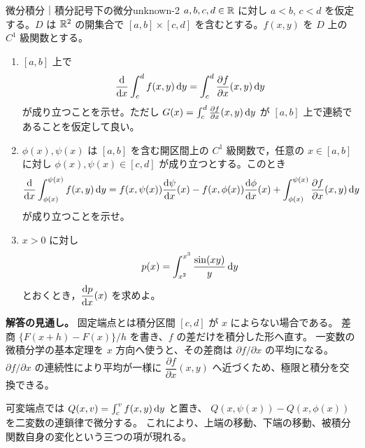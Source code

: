 \begin{problem}{微分積分｜積分記号下の微分}{unknown-2}
$a,b,c,d\in\mathbb{R}$ に対し $a<b$, $c<d$ を仮定する。$D$ は $\mathbb{R}^2$ の開集合で $[a,b]\times[c,d]$ を含むとする。$f(x,y)$ を $D$ 上の $C^1$ 級関数とする。
\begin{enumerate}
  \item[(1)] $[a,b]$ 上で
  \[
  \frac{\mathrm{d}}{\mathrm{d} x}\int_c^d f(x,y)\,\mathrm{d} y=\int_c^d\frac{\partial f}{\partial x}(x,y)\,\mathrm{d} y
  \]
  が成り立つことを示せ。ただし $G(x)=\int_c^d\frac{\partial f}{\partial x}(x,y)\,\mathrm{d} y$ が $[a,b]$ 上で連続であることを仮定して良い。
  \item[(2)] $\phi(x),\psi(x)$ は $[a,b]$ を含む開区間上の $C^1$ 級関数で，任意の $x\in[a,b]$ に対し $\phi(x),\psi(x)\in[c,d]$ が成り立つとする。このとき
  \[
  \frac{\mathrm{d}}{\mathrm{d} x}\int_{\phi(x)}^{\psi(x)}f(x,y)\,\mathrm{d} y
  =f(x,\psi(x))\frac{\mathrm{d}\psi}{\mathrm{d} x}(x)-f(x,\phi(x))\frac{\mathrm{d}\phi}{\mathrm{d} x}(x)
  +\int_{\phi(x)}^{\psi(x)}\frac{\partial f}{\partial x}(x,y)\,\mathrm{d} y
  \]
  が成り立つことを示せ。
  \item[(3)] $x>0$ に対し
  \[
  p(x)=\int_{x^2}^{x^3}\frac{\sin(xy)}y\,\mathrm{d} y
  \]
  とおくとき，$\dfrac{\mathrm{d} p}{\mathrm{d} x}(x)$ を求めよ。
\end{enumerate}
\end{problem}
\begin{memo*}
\textbf{解答の見通し。}
固定端点とは積分区間 $[c,d]$ が $x$ によらない場合である。
差商 $\{F(x+h)-F(x)\}/h$ を書き、$f$ の差だけを積分した形へ直す。
一変数の微積分学の基本定理を $x$ 方向へ使うと、その差商は $\partial f/\partial x$ の平均になる。
$\partial f/\partial x$ の連続性により平均が一様に $\dfrac{\partial f}{\partial x}(x,y)$ へ近づくため、極限と積分を交換できる。

可変端点では $Q(x,v)=\int_c^v f(x,y)\,\mathrm{d} y$ と置き、
$Q(x,\psi(x))-Q(x,\phi(x))$ を二変数の連鎖律で微分する。
これにより、上端の移動、下端の移動、被積分関数自身の変化という三つの項が現れる。
\end{memo*}
